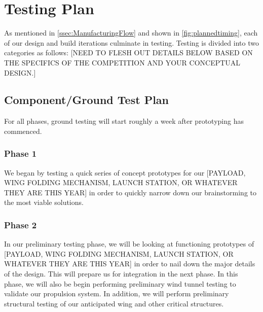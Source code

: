 
\section{Testing Plan} %
\label{sec:TestingPlan}

As mentioned in \cref{ssec:ManufacturingFlow} and shown in \cref{fig:plannedtiming}, each of our design and build iterations culminate in testing.  Testing is divided into two categories as follows:
{\color{BYUred}[NEED TO FLESH OUT DETAILS BELOW BASED ON THE SPECIFICS OF THE COMPETITION AND YOUR CONCEPTUAL DESIGN.]}


\subsection{Component/Ground Test Plan}
\label{ssec:GroundTestingPlan}

For all phases, ground testing will start roughly a week after prototyping has commenced. 

\subsubsection{Phase 1} We began by testing a quick series of concept prototypes for our {\color{BYUred}[PAYLOAD, WING FOLDING MECHANISM, LAUNCH STATION, OR WHATEVER THEY ARE THIS YEAR]} in order to quickly narrow down our brainstorming to the most viable solutions.

\subsubsection{Phase 2} In our preliminary testing phase, we will be looking at functioning prototypes of {\color{BYUred}[PAYLOAD, WING FOLDING MECHANISM, LAUNCH STATION, OR WHATEVER THEY ARE THIS YEAR]} in order to nail down the major details of the design.  This will prepare us for integration in the next phase.  In this phase, we will also be begin performing preliminary wind tunnel testing to validate our propulsion system. In addition, we will perform preliminary structural testing of our anticipated wing and other critical structures.

